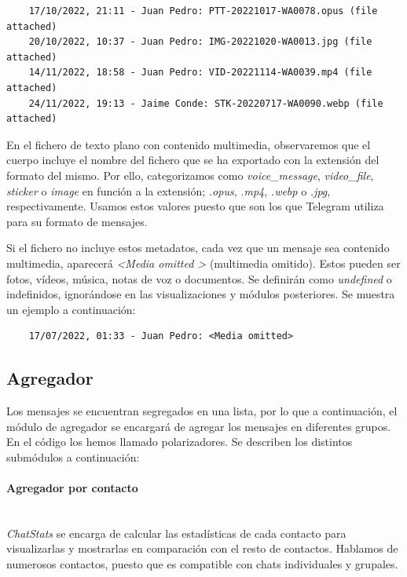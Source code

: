 \begin{lstlisting}
	17/10/2022, 21:11 - Juan Pedro: PTT-20221017-WA0078.opus (file attached)
	20/10/2022, 10:37 - Juan Pedro: IMG-20221020-WA0013.jpg (file attached)
	14/11/2022, 18:58 - Juan Pedro: VID-20221114-WA0039.mp4 (file attached)
	24/11/2022, 19:13 - Jaime Conde: STK-20220717-WA0090.webp (file attached)
\end{lstlisting}

En el fichero de texto plano con contenido multimedia, observaremos que el cuerpo incluye el nombre del fichero que se ha exportado con la extensión del formato del mismo. Por ello, categorizamos como \textit{voice\_message}, \textit{video\_file}, \textit{sticker} o \textit{image} en función a la extensión; \textit{.opus}, \textit{.mp4}, \textit{.webp} o \textit{.jpg}, respectivamente. Usamos estos valores puesto que son los que Telegram utiliza para su formato de mensajes.

Si el fichero no incluye estos metadatos, cada vez que un mensaje sea contenido multimedia, aparecerá \textit{\textless Media omitted \textgreater} (multimedia omitido). Estos pueden ser fotos, vídeos, música, notas de voz o documentos. Se definirán como \textit{undefined} o indefinidos, ignorándose en las visualizaciones y módulos posteriores. Se muestra un ejemplo a continuación:

\begin{lstlisting}
	17/07/2022, 01:33 - Juan Pedro: <Media omitted>
\end{lstlisting}

\subsection{Agregador}

Los mensajes se encuentran segregados en una lista, por lo que a continuación, el módulo de agregador se encargará de agregar los mensajes en diferentes grupos. En el código los hemos llamado polarizadores. Se describen los distintos submódulos a continuación:

\paragraph{Agregador por contacto}\mbox{}\\

\textit{ChatStats} se encarga de calcular las estadísticas de cada contacto para visualizarlas y mostrarlas en comparación con el resto de contactos. Hablamos de numerosos contactos, puesto que es compatible con chats individuales y grupales.

